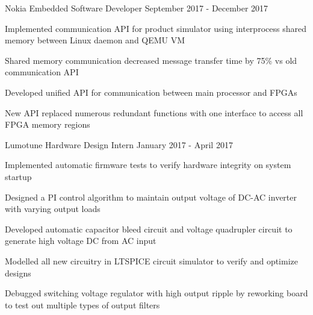 \begin{cventries}
  \cventry
    {Nokia} %
    {Embedded Software Developer} %
    {September 2017 - December 2017} %
    {}
    {
      \begin{cvitems} %
        \item {Implemented communication API for product simulator using interprocess shared memory between Linux daemon and QEMU VM}
        \item {Shared memory communication decreased message transfer time by 75\% vs old communication API}
        \item {Developed unified API for communication between main processor and FPGAs}
        \item {New API replaced numerous redundant functions with one interface to access all FPGA memory regions}
      \end{cvitems}
    }

  \cventry
    {Lumotune} %
    {Hardware Design Intern} %
    {January 2017 - April 2017} %
    {}
    {
      \begin{cvitems} %
        \item {Implemented automatic firmware tests to verify hardware integrity on system startup}
        \item {Designed a PI control algorithm to maintain output voltage of DC-AC inverter with varying output loads}
        \item {Developed automatic capacitor bleed circuit and voltage quadrupler circuit to generate high voltage DC from AC input}
        \item {Modelled all new circuitry in LTSPICE circuit simulator to verify and optimize designs}
        \item {Debugged switching voltage regulator with high output ripple by reworking board to test out multiple types of output filters}
      \end{cvitems}
    }


\end{cventries}
